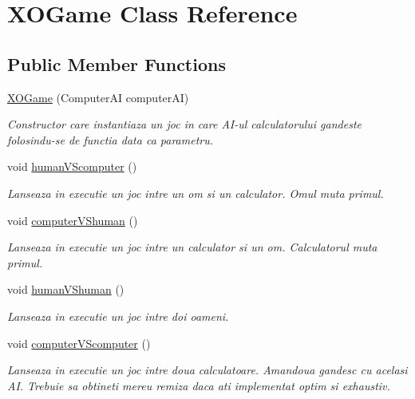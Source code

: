 \hypertarget{classXOGame}{
\section{XOGame Class Reference}
\label{classXOGame}
}
\subsection*{Public Member Functions}
\begin{DoxyCompactItemize}
\item 
\hyperlink{classXOGame_ae03433c323f4c08cfff2c9e8d26e7530}{XOGame} (ComputerAI computerAI)
\begin{DoxyCompactList}\small\item\em Constructor care instantiaza un joc in care AI-\/ul calculatorului gandeste folosindu-\/se de functia data ca parametru. \end{DoxyCompactList}\item 
\hypertarget{classXOGame_aacde44d6398b72595008996a7ac3d72d}{
void \hyperlink{classXOGame_aacde44d6398b72595008996a7ac3d72d}{humanVScomputer} ()}
\label{classXOGame_aacde44d6398b72595008996a7ac3d72d}

\begin{DoxyCompactList}\small\item\em Lanseaza in executie un joc intre un om si un calculator. Omul muta primul. \end{DoxyCompactList}\item 
\hypertarget{classXOGame_a322eaf2fceb6d4ff6f88102708b7d8ea}{
void \hyperlink{classXOGame_a322eaf2fceb6d4ff6f88102708b7d8ea}{computerVShuman} ()}
\label{classXOGame_a322eaf2fceb6d4ff6f88102708b7d8ea}

\begin{DoxyCompactList}\small\item\em Lanseaza in executie un joc intre un calculator si un om. Calculatorul muta primul. \end{DoxyCompactList}\item 
\hypertarget{classXOGame_aeb2ca697dff9b16d8abfc438e019c167}{
void \hyperlink{classXOGame_aeb2ca697dff9b16d8abfc438e019c167}{humanVShuman} ()}
\label{classXOGame_aeb2ca697dff9b16d8abfc438e019c167}

\begin{DoxyCompactList}\small\item\em Lanseaza in executie un joc intre doi oameni. \end{DoxyCompactList}\item 
\hypertarget{classXOGame_a2546fa6a5ee36ab0d380fe2b5ea5096f}{
void \hyperlink{classXOGame_a2546fa6a5ee36ab0d380fe2b5ea5096f}{computerVScomputer} ()}
\label{classXOGame_a2546fa6a5ee36ab0d380fe2b5ea5096f}

\begin{DoxyCompactList}\small\item\em Lanseaza in executie un joc intre doua calculatoare. Amandoua gandesc cu acelasi AI. Trebuie sa obtineti mereu remiza daca ati implementat optim si exhaustiv. \end{DoxyCompactList}\end{DoxyCompactItemize}


